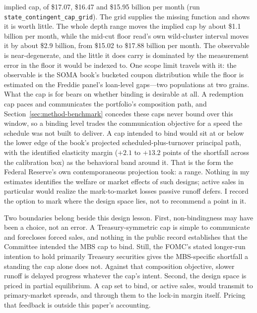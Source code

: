 \documentclass[12pt]{article}
\begin{document}
implied cap, of \$17.07, \$16.47 and \$15.95 billion per month (run \texttt{state\_contingent\_cap\_grid}). The grid supplies the missing function and shows it is worth little. The whole depth range moves the implied cap by about \$1.1 billion per month, while the mid-cut floor read's own wild-cluster interval moves it by about \$2.9 billion, from \$15.02 to \$17.88 billion per month. The observable is near-degenerate, and the little it does carry is dominated by the measurement error in the floor it would be indexed to. One scope limit travels with it: the observable is the SOMA book's bucketed coupon distribution while the floor is estimated on the Freddie panel's loan-level gaps---two populations at two grains. What the cap is for bears on whether binding is desirable at all. A redemption cap paces and communicates the portfolio's composition path, and Section~\ref{sec:method-benchmark} concedes these caps never bound over this window, so a binding level trades the communication objective for a speed the schedule was not built to deliver. A cap intended to bind would sit at or below the lower edge of the book's projected scheduled-plus-turnover principal path, with the identified elasticity margin ($+2.1$ to $+13.2$ points of the shortfall across the calibration box) as the behavioral band around it. That is the form the Federal Reserve's own contemporaneous projection took: a range. Nothing in my estimates identifies the welfare or market effects of such designs; active sales in particular would realize the mark-to-market losses passive runoff defers. I record the option to mark where the design space lies, not to recommend a point in it.

Two boundaries belong beside this design lesson. First, non-bindingness may have been a choice, not an error. A Treasury-symmetric cap is simple to communicate and forecloses forced sales, and nothing in the public record establishes that the Committee intended the MBS cap to bind. Still, the FOMC's stated longer-run intention to hold primarily Treasury securities gives the MBS-specific shortfall a standing the cap alone does not. Against that composition objective, slower runoff is delayed progress whatever the cap's intent. Second, the design space is priced in partial equilibrium. A cap set to bind, or active sales, would transmit to primary-market spreads, and through them to the lock-in margin itself. Pricing that feedback is outside this paper's accounting.
\end{document}
